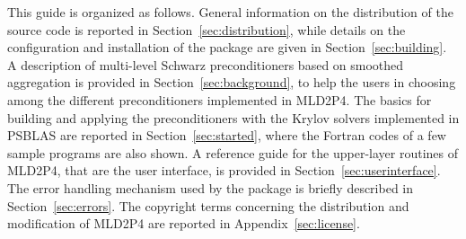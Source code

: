This guide is organized as follows. General information on the distribution of the source code
is reported in Section~\ref{sec:distribution}, while details on the configuration
and installation of the package are given in Section~\ref{sec:building}. A description of
multi-level Schwarz preconditioners based on smoothed aggregation is provided
in Section~\ref{sec:background}, to help the users in choosing among the different preconditioners
implemented in MLD2P4. The basics for building and applying the preconditioners
with the Krylov solvers implemented in PSBLAS are reported in Section~\ref{sec:started}, where the
Fortran codes of a few sample programs are also shown. A reference guide for
the upper-layer routines of MLD2P4, that are the user interface, is provided
in Section~\ref{sec:userinterface}. The error handling mechanism used by the package is briefly described
in Section~\ref{sec:errors}. The copyright terms concerning the distribution and modification
of MLD2P4 are reported in Appendix~\ref{sec:license}.

